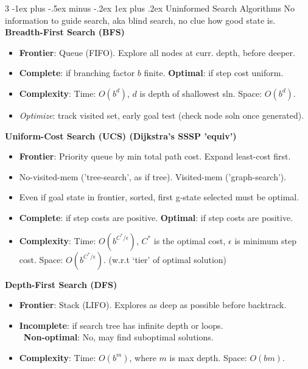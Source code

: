\documentclass[a4paper, 9pt, landscape]{article}
\makeatletter
\renewcommand{\subsubsection}{\@startsection{subsubsection}{3}{0mm}%
                                {-1ex plus -.5ex minus -.2ex}%
                                {1ex plus .2ex}%
                                {\normalfont\small\bfseries}}
\makeatother
\begin{document}
\begin{multicols*}{3}
\subsubsection{Uninformed Search Algorithms}
No information to guide search, aka blind search, no clue how good state is. \\
\smallskip
\textbf{Breadth-First Search (BFS)}
\begin{itemize}
    \item \textbf{Frontier}: Queue (FIFO). Explore all nodes at curr. depth, before deeper.
    \item \textbf{Complete}: if branching factor $b$ finite. \textbf{Optimal}: if step cost uniform.
    \item \textbf{Complexity}: Time: $O(b^d)$, $d$ is depth of shallowest sln. Space: $O(b^d)$.
    \item \textit{Optimize}: track visited set, early goal test (check node soln once generated).
\end{itemize}
\smallskip
\textbf{Uniform-Cost Search (UCS) (Dijkstra's SSSP 'equiv')}
\begin{itemize}
    \item \textbf{Frontier}: Priority queue by min total path cost. Expand least-cost first.
    \item No-visited-mem ('tree-search', as if tree). Visited-mem ('graph-search').
    \item Even if goal state in frontier, sorted, first g-state selected must be optimal.
    \item \textbf{Complete}: if step costs are positive. \textbf{Optimal}: if step costs are positive.
    \item \textbf{Complexity}: Time: $O(b^{C^*/\epsilon})$, $C^*$ is the optimal cost, $\epsilon$ is minimum step cost. Space: $O(b^{C^*/\epsilon})$. (w.r.t `tier' of optimal solution)
\end{itemize}
\smallskip
\textbf{Depth-First Search (DFS)}
\begin{itemize}
    \item \textbf{Frontier}: Stack (LIFO). Explores as deep as possible before backtrack.
    \item \textbf{Incomplete}: if search tree has infinite depth or loops. \\\
     \textbf{Non-optimal}: No, may find suboptimal solutions.
    \item \textbf{Complexity}: Time: $O(b^m)$, where $m$ is max depth. Space: $O(bm)$.
\end{itemize}
\smallskip

\end{multicols*}
\end{document}
